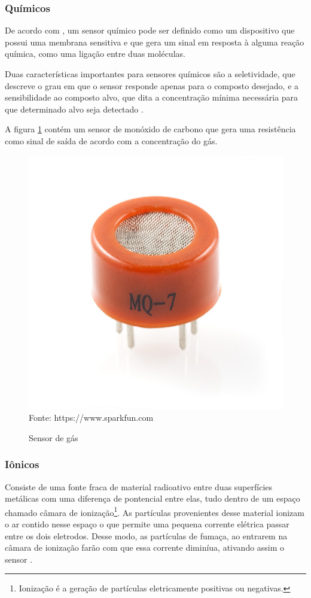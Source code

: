 \subsubsection{Químicos}
De acordo com , um sensor químico pode ser definido como um dispositivo que possui uma
membrana sensitiva e que gera um sinal em resposta à alguma reação química, como uma ligação entre duas
moléculas.

Duas características importantes para sensores químicos são a seletividade, que descreve o grau em que o sensor
responde apenas para o composto desejado, e a sensibilidade ao composto alvo, que dita a concentração mínima
necessária para que determinado alvo seja detectado \cite{fraden2010}.

A figura \ref{figura:gas} contém um sensor de monóxido de carbono que gera uma resistência como sinal de
saída de acordo com a concentração do gás.

\begin{figure}[h]
	\caption{Sensor de gás}
	\centering
	\includegraphics[scale=0.5]{../images/carbon-monoxide.jpg}
	\hspace{\linewidth}
	Fonte: https://www.sparkfun.com
	\label{figura:gas}
\end{figure}

\subsubsection{Iônicos}
Consiste de uma fonte fraca de material radioativo entre duas superfícies metálicas com uma diferença de
pontencial entre elas, tudo dentro de um espaço chamado câmara de ionização\footnote{Ionização é a geração de
partículas eletricamente positivas ou negativas.}. As partículas provenientes desse material ionizam o ar
contido nesse espaço o que permite uma pequena corrente elétrica passar entre os dois eletrodos.  Desse modo,
as partículas de fumaça, ao entrarem na câmara de ionização farão com que essa corrente diminíua, ativando
assim o sensor \cite{sinclair2001}.

